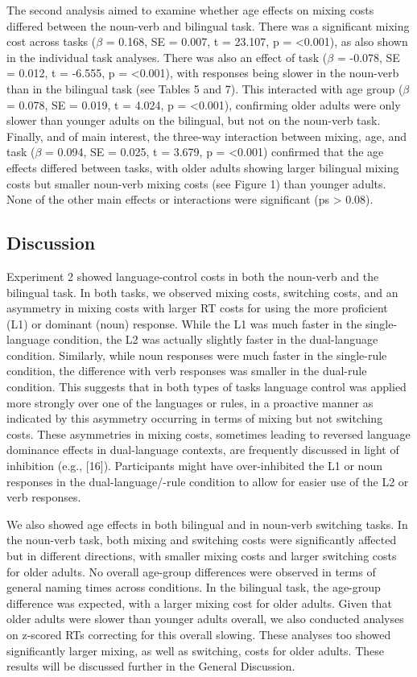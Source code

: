 \documentclass[
]{article}
\begin{document}
The second analysis aimed to examine whether age effects on mixing costs differed between the noun-verb and bilingual task. There was a significant mixing cost across tasks (\(\beta\) = 0.168, SE = 0.007, t = 23.107, p = \textless0.001), as also shown in the individual task analyses. There was also an effect of task (\(\beta\) = -0.078, SE = 0.012, t = -6.555, p = \textless0.001), with responses being slower in the noun-verb than in the bilingual task (see Tables 5 and 7). This interacted with age group (\(\beta\) = 0.078, SE = 0.019, t = 4.024, p = \textless0.001), confirming older adults were only slower than younger adults on the bilingual, but not on the noun-verb task. Finally, and of main interest, the three-way interaction between mixing, age, and task (\(\beta\) = 0.094, SE = 0.025, t = 3.679, p = \textless0.001) confirmed that the age effects differed between tasks, with older adults showing larger bilingual mixing costs but smaller noun-verb mixing costs (see Figure 1) than younger adults. None of the other main effects or interactions were significant (ps \textgreater{} 0.08).

\hypertarget{discussion-1}{%
\subsection{Discussion}\label{discussion-1}}

Experiment 2 showed language-control costs in both the noun-verb and the bilingual task. In both tasks, we observed mixing costs, switching costs, and an asymmetry in mixing costs with larger RT costs for using the more proficient (L1) or dominant (noun) response. While the L1 was much faster in the single-language condition, the L2 was actually slightly faster in the dual-language condition. Similarly, while noun responses were much faster in the single-rule condition, the difference with verb responses was smaller in the dual-rule condition. This suggests that in both types of tasks language control was applied more strongly over one of the languages or rules, in a proactive manner as indicated by this asymmetry occurring in terms of mixing but not switching costs. These asymmetries in mixing costs, sometimes leading to reversed language dominance effects in dual-language contexts, are frequently discussed in light of inhibition (e.g., {[}16{]}). Participants might have over-inhibited the L1 or noun responses in the dual-language/-rule condition to allow for easier use of the L2 or verb responses.

We also showed age effects in both bilingual and in noun-verb switching tasks. In the noun-verb task, both mixing and switching costs were significantly affected but in different directions, with smaller mixing costs and larger switching costs for older adults. No overall age-group differences were observed in terms of general naming times across conditions. In the bilingual task, the age-group difference was expected, with a larger mixing cost for older adults. Given that older adults were slower than younger adults overall, we also conducted analyses on z-scored RTs correcting for this overall slowing. These analyses too showed significantly larger mixing, as well as switching, costs for older adults. These results will be discussed further in the General Discussion.
\end{document}
